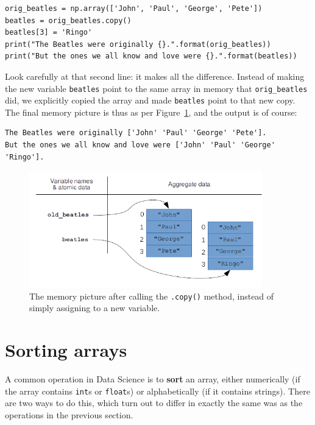 \begin{Verbatim}[fontsize=\small,samepage=true,frame=single,framesep=3mm]
orig_beatles = np.array(['John', 'Paul', 'George', 'Pete'])
beatles = orig_beatles.copy()
beatles[3] = 'Ringo'
print("The Beatles were originally {}.".format(orig_beatles))
print("But the ones we all know and love were {}.".format(beatles))
\end{Verbatim}

Look carefully at that second line: it makes all the difference. Instead of
making the new variable \texttt{beatles} point to the same array in memory that
\texttt{orig\_beatles} did, we explicitly copied the array and made
\texttt{beatles} point to that new copy. The final memory picture is thus as
per Figure~\ref{fig:copyNotRef}, and the output is of course:

\begin{Verbatim}[fontsize=\scriptsize,samepage=true,frame=leftline,framesep=5mm,framerule=1mm]
The Beatles were originally ['John' 'Paul' 'George' 'Pete'].
But the ones we all know and love were ['John' 'Paul' 'George' 'Ringo'].
\end{Verbatim}

\begin{figure}[ht]
\centering
\includegraphics[width=0.9\textwidth]{copyNotRef.png}
\caption{The memory picture after calling the \texttt{.copy()} method, instead
of simply assigning to a new variable.}
\label{fig:copyNotRef}
\end{figure}


\section{Sorting arrays}

A common operation in Data Science is to \textbf{sort} an array, either
numerically (if the array contains \texttt{int}s or \texttt{float}s) or
alphabetically (if it contains strings). There are two ways to do this, which
turn out to differ in exactly the same was as the operations in the previous
section.

